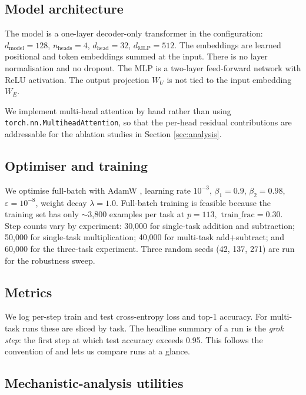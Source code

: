 \subsection{Model architecture}

The model is a one-layer decoder-only transformer in the
\citet{nanda2023progress} configuration:
$d_{\mathrm{model}} = 128$, $n_{\mathrm{heads}} = 4$, $d_{\mathrm{head}} = 32$,
$d_{\mathrm{MLP}} = 512$. The embeddings are learned positional and
token embeddings summed at the input. There is no layer normalisation and
no dropout. The MLP is a two-layer feed-forward network with ReLU
activation. The output projection $W_U$ is not tied to the input
embedding $W_E$.

We implement multi-head attention by hand rather than using
\texttt{torch.nn.MultiheadAttention}, so that the per-head residual
contributions are addressable for the ablation studies in Section
\ref{sec:analysis}.

\subsection{Optimiser and training}

We optimise full-batch with AdamW \citep{loshchilov2019adamw}, learning
rate $10^{-3}$, $\beta_1 = 0.9$, $\beta_2 = 0.98$, $\varepsilon = 10^{-8}$,
weight decay $\lambda = 1.0$. Full-batch training is feasible because the
training set has only $\sim$3,800 examples per task at $p = 113,$
$\mathrm{train\_frac} = 0.30$. Step counts vary by experiment:
30,000 for single-task addition and subtraction; 50,000 for single-task
multiplication; 40,000 for multi-task add+subtract; and 60,000 for the
three-task experiment. Three random seeds (42, 137, 271) are run for the
robustness sweep.

\subsection{Metrics}

We log per-step train and test cross-entropy loss and top-1 accuracy.
For multi-task runs these are sliced by task. The headline summary of a
run is the \emph{grok step}: the first step at which test accuracy
exceeds 0.95. This follows the convention of \citet{nanda2023progress}
and lets us compare runs at a glance.

\subsection{Mechanistic-analysis utilities}

